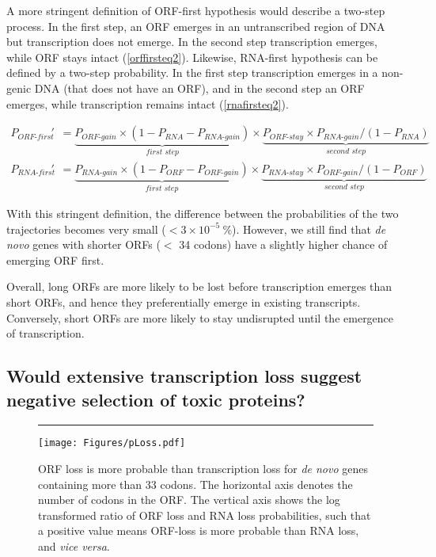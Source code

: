 \documentclass[12pt,a4paper]{article}
\begin{document}
A more stringent definition of ORF-first hypothesis would describe a two-step process. In the first step, an ORF emerges in an untranscribed region of DNA but transcription does not emerge. In the second step transcription emerges, while ORF stays intact (\autoref{orffirsteq2}). Likewise, RNA-first hypothesis can be defined by a two-step probability. In the first step transcription emerges in a non-genic DNA (that does not have an ORF), and in the second step an ORF emerges, while transcription remains intact (\autoref{rnafirsteq2}).

\begin{align}
P_\textit{ORF-first}' & = \underbrace{P_\textit{ORF-gain} \times (1-P_\textit{RNA} -P_\textit{RNA-gain})}_\textit{first step} \times \underbrace{P_\textit{ORF-stay}\times P_\textit{RNA-gain}/(1-P_\textit{RNA})}_\textit{second step} \label{orffirsteq2}\\[1em]
P_\textit{RNA-first}' & = \underbrace{P_\textit{RNA-gain} \times (1-P_\textit{ORF} -P_\textit{ORF-gain})}_\textit{first step} \times \underbrace{P_\textit{RNA-stay}\times P_\textit{ORF-gain}/(1-P_\textit{ORF})}_\textit{second step}\label{rnafirsteq2}
\end{align}

With this stringent definition, the difference between the probabilities of the two trajectories becomes very small ($< 3\times10^{-5}\ \%$). However, we still find that \textit{de novo} genes with shorter ORFs ($<$ 34 codons) have a slightly higher chance of emerging ORF first.

Overall, long ORFs are more likely to be lost before transcription emerges than short ORFs, and hence they preferentially emerge in existing transcripts. Conversely, short ORFs are more likely to stay undisrupted until the emergence of transcription.

\subsection{Would extensive transcription loss suggest negative selection of toxic proteins?}


\begin{figure}[!b]
\centering
\hrule
\vspace{1ex}
\texttt{[image: Figures/pLoss.pdf]}
\caption{ORF loss is more probable than transcription loss for \textit{de novo} genes containing more than 33 codons. The horizontal axis denotes the number of codons in the ORF. The vertical axis shows the log transformed ratio of ORF loss and RNA loss probabilities, such that a positive value means ORF-loss is more probable than RNA loss, and \textit{vice versa}.}
\label{lossprob}
\end{figure}
\end{document}
